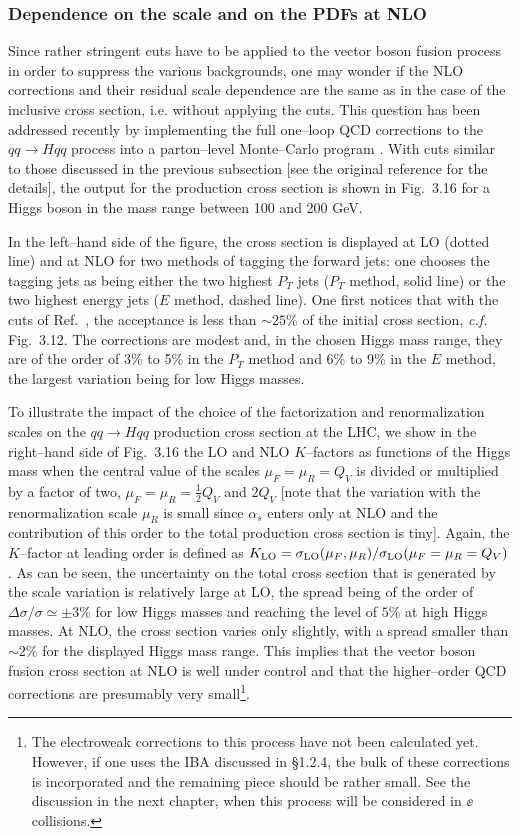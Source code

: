 \subsubsection{Dependence on the scale and on the PDFs at NLO}

Since rather stringent cuts have to be applied to the vector boson fusion
process in order to suppress the various backgrounds, one may wonder if the NLO
corrections and their residual scale dependence are the same as in the case of
the inclusive cross section, i.e. without applying the cuts.  This question has
been addressed recently \cite{pp-Hqq-NLO2,MC-WWNLO} by implementing the full
one--loop QCD corrections to the $qq \to Hqq$ process into a parton--level
Monte--Carlo program \cite{pp-MCFM}. With cuts similar to those discussed in
the previous subsection [see the original reference for the details], the
output for the production cross section is shown in Fig.~3.16 for a Higgs boson
in the mass range between 100 and 200 GeV.\s

In the left--hand side of the figure, the cross section is displayed at LO
(dotted line) and at NLO for two methods of tagging the forward jets: one
chooses the tagging jets as being either the two highest $P_T$ jets ($P_T$
method, solid line) or the two highest energy jets ($E$ method, dashed line).
One first notices that with the cuts of Ref.~\cite{pp-Hqq-NLO2}, the acceptance
is less than $\sim 25\%$ of the initial cross section, {\it c.f.} Fig.~3.12. 
The corrections are modest and, in the chosen Higgs mass range, they are of the
order of 3\% to 5\% in the $P_T$ method and 6\% to 9\% in the $E$ method, the
largest variation being for low Higgs masses.\s 
   
To illustrate the impact of the choice of the factorization and renormalization
scales on the $qq \to Hqq$ production cross section at the LHC, we show in the
right--hand side of Fig.~3.16 the LO and NLO $K$--factors as functions of the
Higgs mass when the central value of the scales $\mu_F=\mu_R = Q_V$ is divided
or multiplied by a factor of two, $\mu_F=\mu_R=\frac{1}{2} Q_V$ and $2Q_V$
[note that the variation with the renormalization scale $\mu_R$ is small since
$\alpha_s$ enters only at NLO and the contribution of this order to the total
production cross section is tiny]. Again, the $K$--factor at leading order is
defined as $K_{\rm LO} = \sigma_{\rm LO} (\mu_F, \mu_R)/\sigma_{\rm LO}(\mu_F=
\mu_R= Q_V)$. As can be seen, the uncertainty on the total cross section that
is generated by the scale variation is relatively large at LO, the spread being
of the order of $\Delta\sigma/\sigma \simeq \pm 3\%$ for low Higgs masses and 
reaching
the level of $5\%$ at high Higgs masses. At NLO, the cross section varies only
slightly, with a spread smaller than $\sim 2\%$ for the displayed Higgs mass
range. This implies that the vector boson fusion cross section at NLO is well
under control and that the higher--order QCD corrections are presumably very
small\footnote{The electroweak corrections to this process have not been
calculated yet. However, if one  uses the IBA discussed in \S1.2.4, the bulk of 
these corrections is incorporated and the remaining piece should be rather 
small. See the discussion in the next chapter, when this process will be 
considered in $\ee$ collisions.}.


